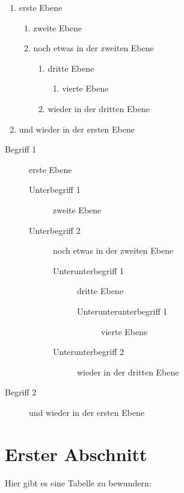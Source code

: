 \documentclass[BCOR=1cm, twoside, ngerman]{scrreprt}
\begin{document}
\vspace{1cm} %

\begin{enumerate}
\item erste Ebene
  \begin{enumerate}
  \item zweite Ebene
  \item noch etwas in der zweiten Ebene
    \begin{enumerate}
    \item dritte Ebene
      \begin{enumerate}
      \item vierte Ebene
      \end{enumerate} 
    \item wieder in der dritten Ebene
    \end{enumerate}
  \end{enumerate}
\item und wieder in der ersten Ebene
\end{enumerate}

\vspace{1cm}

\begin{description}
\item[Begriff 1] erste Ebene
  \begin{description}
  \item[Unterbegriff 1] zweite Ebene
  \item[Unterbegriff 2] noch etwas in der zweiten Ebene
    \begin{description}
    \item[Unterunterbegriff 1] dritte Ebene
      \begin{description}
      \item[Unterunterunterbegriff 1] vierte Ebene
      \end{description} 
    \item[Unterunterbegriff 2] wieder in der dritten Ebene
    \end{description}
  \end{description}
\item[Begriff 2] und wieder in der ersten Ebene
\end{description}

\section{Erster Abschnitt}
Hier gibt es eine Tabelle zu bewundern:
\end{document}
